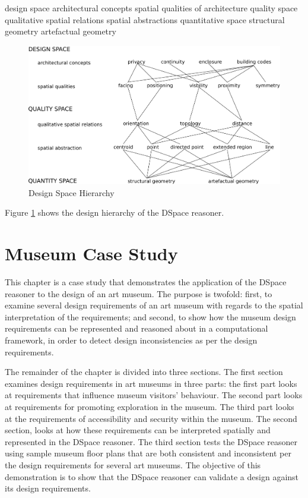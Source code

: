 \documentclass[12pt]{ucthesis}
\begin{document}
design space 
   architectural concepts
   spatial qualities of architecture
quality space
   qualitative spatial relations
   spatial abstractions
quantitative space
   structural geometry
   artefactual geometry
   
   
\begin{figure}[H]
\centering
\includegraphics[width=140mm]{hierarchy2}
\caption{Design Space Hierarchy}
\label{hierarchy}
\end{figure}

Figure \ref{hierarchy} shows the design hierarchy of the DSpace reasoner.



\chapter{Museum Case Study}
This chapter is a case study that demonstrates the application of the DSpace reasoner to the design of an art museum. The purpose is twofold: first, to examine several design requirements of an art museum with regards to the spatial interpretation of the requirements; and second, to show how the museum design requirements can be represented and reasoned about in a computational framework, in order to detect design inconsistencies as per the design requirements.

The remainder of the chapter is divided into three sections. The first section examines design requirements in art museums in three parts: the first part looks at requirements that influence museum visitors' behaviour. The second part looks at requirements for promoting exploration in the museum. The third part looks at the requirements of accessibility and security within the museum. The second section, looks at how these requirements can be interpreted spatially and represented in the DSpace reasoner. The third section tests the DSpace reasoner using sample museum floor plans that are both consistent and inconsistent per the design requirements for several art museums. The objective of this demonstration is to show that the DSpace reasoner can validate a design against its design requirements.
\end{document}
